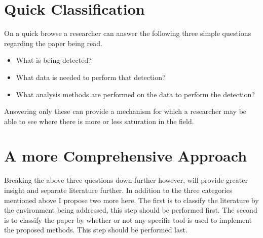 \documentclass[10pt]{IEEEtran}
\begin{document}
\section{Quick Classification}
On a quick browse a researcher can answer the following three simple questions regarding the paper being read. 
\begin{itemize}
    \item What is being detected?
    \item What data is needed to perform that detection?
    \item What analysis methods are performed on the data to perform the detection?
\end{itemize}
Answering only these can provide a mechanism for which a researcher may be able to see where there is more or less saturation in the field.

\section{A more Comprehensive Approach}
Breaking the above three questions down further however, will provide greater insight and separate literature further. In addition to the three categories mentioned above I propose two more here. The first is to classify the literature by the environment being addressed, this step should be performed first. The second is to classify the paper by whether or not any specific tool is used to implement the proposed methods. This step should be performed last.\\
\end{document}
